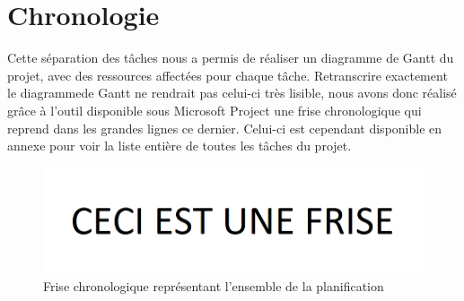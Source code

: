 \section{Chronologie}
\label{sec:chronologie}

	Cette séparation des tâches nous a permis de réaliser un diagramme de Gantt du projet, avec des ressources affectées pour chaque tâche. Retranscrire exactement le diagrammede Gantt ne rendrait pas celui-ci très lisible, nous avons donc réalisé grâce à l'outil disponible sous Microsoft Project une frise chronologique qui reprend dans les grandes lignes ce dernier. Celui-ci est cependant disponible en annexe pour voir la liste entière de toutes les tâches du projet.

	\begin{figure}[H]
        \centering
        \includegraphics[width=1.3\textwidth, angle=90]{figure/frise.png}
            \caption{Frise chronologique représentant l'ensemble de la planification}
            \label{fig:frise}
    \end{figure}